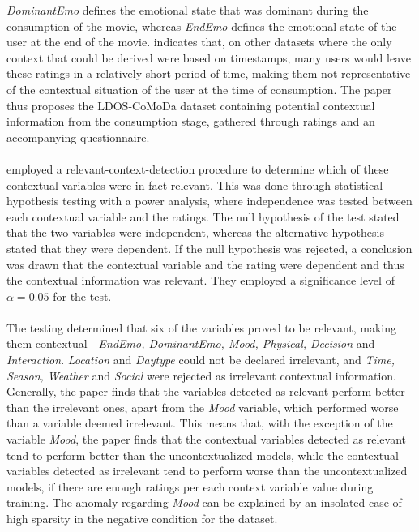 \textit{DominantEmo} defines the emotional state that was dominant during the consumption of the movie, whereas \textit{EndEmo} defines the emotional state of the user at the end of the movie\cite{COMODA2013}.
\cite{COMODA2013} indicates that, on other datasets where the only context that could be derived were based on timestamps, many users would leave these ratings in a relatively short period of time, making them not representative of the contextual situation of the user at the time of consumption.
The paper thus proposes the LDOS-CoMoDa dataset containing potential contextual information from the consumption stage, gathered through ratings and an accompanying questionnaire.
\\\\
\cite{COMODA2013} employed a relevant-context-detection procedure to determine which of these contextual variables were in fact relevant.
This was done through statistical hypothesis testing with a power analysis, where independence was tested between each contextual variable and the ratings.
The null hypothesis of the test stated that the two variables were independent, whereas the alternative hypothesis stated that they were dependent.
If the null hypothesis was rejected, a conclusion was drawn that the contextual variable and the rating were dependent and thus the contextual information was relevant.
They employed a significance level of $\alpha = 0.05$ for the test.
\\\\
The testing determined that six of the variables proved to be relevant, making them contextual - \textit{EndEmo, DominantEmo, Mood, Physical, Decision} and \textit{Interaction}.
\textit{Location} and \textit{Daytype} could not be declared irrelevant, and \textit{Time, Season, Weather} and \textit{Social} were rejected as irrelevant contextual information.
Generally, the paper finds that the variables detected as relevant perform better than the irrelevant ones, apart from the \textit{Mood} variable, which performed worse than a variable deemed irrelevant.
This means that, with the exception of the variable \textit{Mood}, the paper finds that the contextual variables detected as relevant tend to perform better than the uncontextualized models, while the contextual variables detected as irrelevant tend to perform worse than the uncontextualized models, if there are enough ratings per each context variable value during training.
The anomaly regarding \textit{Mood} can be explained by an insolated case of high sparsity in the negative condition for the dataset.

